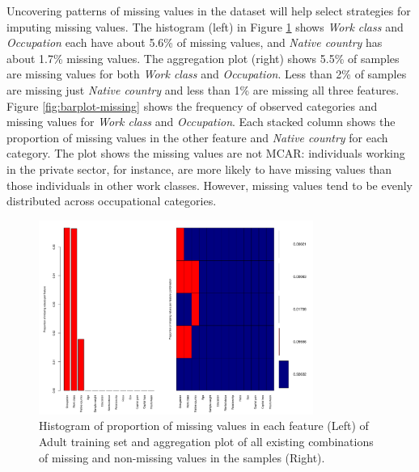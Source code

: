 \documentclass[10pt,twocolumn,letterpaper]{article}
\begin{document}
Uncovering patterns of missing values in the dataset will help select strategies for imputing missing values. The histogram (left) in Figure \ref{fig:proportion-missing} shows \textit{Work class} and \textit{Occupation} each have about 5.6\% of missing values, and \textit{Native country} has about 1.7\% missing values. The aggregation plot (right) shows 5.5\% of samples are missing values for both \textit{Work class} and \textit{Occupation}. Less than 2\% of samples are missing just \textit{Native country} and less than 1\% are missing all three features.\\

Figure \ref{fig:barplot-missing} shows the frequency of observed categories and missing values for \textit{Work class} and \textit{Occupation}. Each stacked column shows the proportion of missing values in the other feature and \textit{Native country} for each category. The plot shows the missing values are not MCAR: individuals working in the private sector, for instance, are more likely to have missing values than those individuals in other work classes. However, missing values tend to be evenly distributed across occupational categories. 

\begin{figure}[htbp] 
   \centering
   \includegraphics[width=0.8\textwidth]{./figure/proportion-missing.pdf}
   \caption{Histogram of proportion of missing values in each feature (Left) of Adult training set and aggregation plot of all existing combinations of missing and non-missing values in the samples (Right).}
   \label{fig:proportion-missing}
\end{figure}
\end{document}

